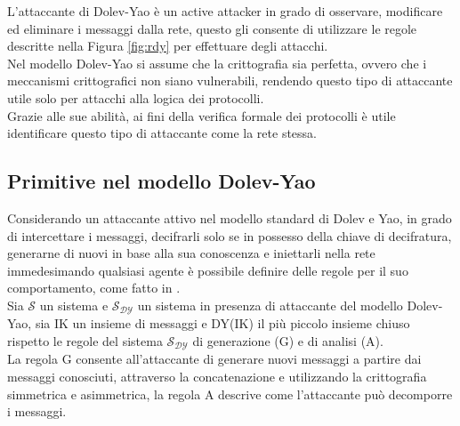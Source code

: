 \noindent L'attaccante di Dolev-Yao è un active attacker in grado di osservare, modificare ed eliminare i messaggi dalla rete, questo gli consente di utilizzare le regole descritte nella Figura \ref*{fig:rdy} per effettuare degli attacchi.\\
Nel modello Dolev-Yao si assume che la crittografia sia perfetta, ovvero che i meccanismi crittografici non siano vulnerabili, rendendo questo tipo di attaccante utile solo per attacchi alla logica dei protocolli.\\ 
Grazie alle sue abilità, ai fini della verifica formale dei protocolli è utile identificare questo tipo di attaccante come la rete stessa.

\subsection{Primitive nel modello Dolev-Yao}
Considerando un attaccante attivo nel modello standard di Dolev e Yao, in grado di intercettare i messaggi, decifrarli solo se in possesso della chiave di decifratura, generarne di nuovi in base alla sua conoscenza e iniettarli nella rete immedesimando qualsiasi agente è possibile definire delle regole per il suo comportamento, come fatto in \cite{RVV17}. \\
Sia $\mathcal{S}$ un sistema e $\mathcal{S_{DY}}$ un sistema in presenza di attaccante del modello Dolev-Yao, sia IK un insieme di messaggi e DY(IK) il più piccolo insieme chiuso rispetto le regole del sistema  $\mathcal{S_{DY}}$ di generazione (G) e di analisi (A). \\
La regola G consente all'attaccante di generare nuovi messaggi a partire dai messaggi conosciuti, attraverso la concatenazione e utilizzando la crittografia simmetrica e asimmetrica, la regola A descrive come l'attaccante può decomporre i messaggi. 

